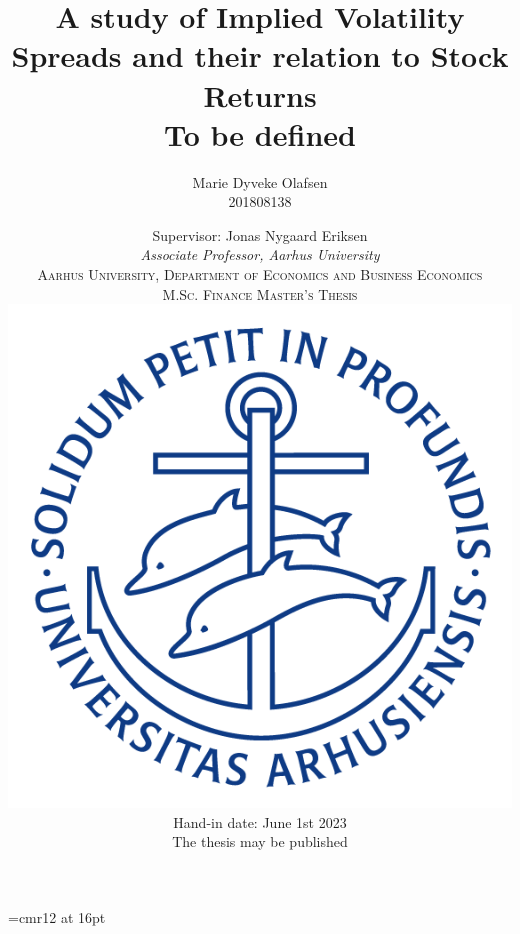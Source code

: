 \font\myfont=cmr12 at 16pt

\newcommand\charactersnofigs{0}
\newcommand\figstables{0}
\newcommand\charspertable{800}
\newcommand\charsperpage{2400}
\newcommand\characterstotal{\the\numexpr(\charactersnofigs+\figstables*\charspertable)  \relax}
\newcommand\pagestotal{\the\numexpr(\characterstotal/\charsperpage)  \relax}

\title{
   {A study of Implied Volatility Spreads and their relation to Stock Returns} \\
    \large{To be defined}
	}
    \date{\bigskip Supervisor: Jonas Nygaard Eriksen \\ [-0.2em]
	\textit{Associate Professor, Aarhus University} \\
	\bigskip \bigskip
	\textsc{Aarhus University, Department of Economics and Business Economics} \\
	\textsc{M.Sc. Finance Master's Thesis}	\\
	\bigskip \bigskip
	\protect	\includegraphics[scale=0.35]{./Pictures/ausegl_blaa} \\
	\bigskip
	Hand-in date: June 1st 2023\\ 
	The thesis may be published \\
}
	
	\author{
	Marie Dyveke Olafsen \\ [-0.2em]
	201808138
	}
\maketitle
\thispagestyle{empty}